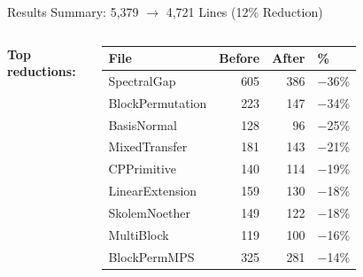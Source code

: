 \documentclass[aspectratio=169,10pt]{beamer}
\begin{document}
\begin{frame}{Results Summary: 5{,}379 $\to$ 4{,}721 Lines (12\% Reduction)}
    \vspace{-0.5em}
    \begin{columns}[T]
        \textbf{\textcolor{leangreen}{Top reductions:}}
        {\scriptsize
        \begin{tabular}{lrrl}
            \toprule
            \textbf{File} & \textbf{Before} & \textbf{After} & \textbf{\%} \\
            \midrule
            \rowcolor{cardbg} SpectralGap       & 605 & 386 & \textcolor{leangreen}{$-$36\%} \\
            BlockPermutation   & 223 & 147 & \textcolor{leangreen}{$-$34\%} \\
            \rowcolor{cardbg} BasisNormal       & 128 &  96 & \textcolor{leangreen}{$-$25\%} \\
            MixedTransfer      & 181 & 143 & \textcolor{leangreen}{$-$21\%} \\
            \rowcolor{cardbg} CPPrimitive       & 140 & 114 & \textcolor{leangreen}{$-$19\%} \\
            LinearExtension    & 159 & 130 & \textcolor{leangreen}{$-$18\%} \\
            \rowcolor{cardbg} SkolemNoether     & 149 & 122 & \textcolor{leangreen}{$-$18\%} \\
            MultiBlock         & 119 & 100 & \textcolor{leangreen}{$-$16\%} \\
            \rowcolor{cardbg} BlockPermMPS      & 325 & 281 & \textcolor{leangreen}{$-$14\%} \\
            \bottomrule
        \end{tabular}
        }


\end{columns}
\end{frame}
\end{document}
